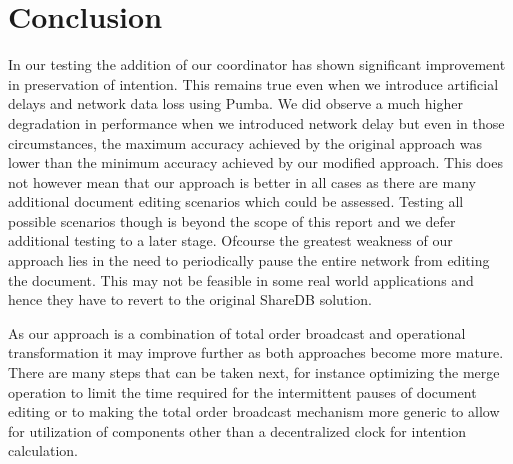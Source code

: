 \documentclass[9pt, titlepage]{article}
\begin{document}
  \section{Conclusion}
  In our testing the addition of our coordinator has shown significant improvement in preservation of intention.
  This remains true even when we introduce artificial delays and network data loss using Pumba. We did observe
  a much higher degradation in performance when we introduced network delay but even in those circumstances, the
  maximum accuracy achieved by the original approach was lower than the minimum accuracy achieved by our modified
  approach. This does not however mean that our approach is better in all cases as there are many additional 
  document editing scenarios which could be assessed. Testing all possible scenarios though is beyond the scope
  of this report and we defer additional testing to a later stage. Ofcourse the greatest weakness of our approach
  lies in the need to periodically pause the entire network from editing the document. This may not be feasible in
  some real world applications and hence they have to revert to the original ShareDB solution.

  As our approach is a combination of total order broadcast and operational transformation it may improve further
  as both approaches become more mature. There are many steps that can be taken next, for instance optimizing the
  merge operation to limit the time required for the intermittent pauses of document editing or to making the
  total order broadcast mechanism more generic to allow for utilization of components other than a decentralized
  clock for intention calculation. 

  \break
\end{document}
